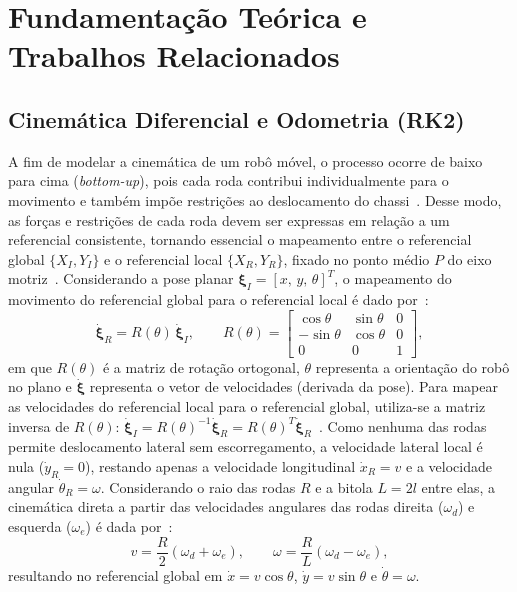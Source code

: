 \section{Fundamentação Teórica e Trabalhos Relacionados}

\subsection{Cinemática Diferencial e Odometria (RK2)}

A fim de modelar a cinemática de um robô móvel, o processo ocorre de
baixo para cima (\textit{bottom-up}), pois cada roda contribui         
individualmente para o movimento e também impõe restrições ao    
deslocamento do chassi~\cite{siegwart2004}. Desse modo, as forças e      
restrições de cada roda devem ser expressas em relação a um referencial  
consistente, tornando essencial o mapeamento entre o referencial global  
$\{X_I, Y_I\}$ e o referencial local $\{X_R, Y_R\}$, fixado no ponto     
médio $P$ do eixo motriz~\cite{siegwart2004}. Considerando a pose planar
$\boldsymbol{\xi}_I = [x,\, y,\, \theta]^T$, o mapeamento do movimento do
referencial global para o referencial local é dado
por~\cite{siegwart2004}:
\begin{equation}
\dot{\boldsymbol{\xi}}_R = R(\theta)\,\dot{\boldsymbol{\xi}}_I, 
\qquad
R(\theta) =
\begin{bmatrix}
\cos\theta & \sin\theta & 0 \\
-\sin\theta & \cos\theta & 0 \\ 
0 & 0 & 1 
\end{bmatrix}, 
\label{eq:rotacao_global_local}
\end{equation} 
em que $R(\theta)$ é a matriz de rotação ortogonal, $\theta$ representa a
orientação do robô no plano e $\dot{\boldsymbol{\xi}}$ representa o vetor
de velocidades (derivada da pose). Para mapear as velocidades do 
referencial local para o referencial global, utiliza-se a matriz inversa 
de $R(\theta)$: $\dot{\boldsymbol{\xi}}_I =
R(\theta)^{-1}\dot{\boldsymbol{\xi}}_R =
R(\theta)^T\dot{\boldsymbol{\xi}}_R$~\cite{siegwart2004}. Como nenhuma 
das rodas permite deslocamento lateral sem escorregamento, a velocidade 
lateral local é nula ($\dot{y}_R = 0$), restando apenas a velocidade 
longitudinal $\dot{x}_R = v$ e a velocidade angular $\dot{\theta}_R =
\omega$. Considerando o raio das rodas $R$ e a bitola $L = 2l$ entre     
elas, a cinemática direta a partir das velocidades angulares das rodas
direita ($\omega_d$) e esquerda ($\omega_e$) é dada 
por~\cite{siegwart2004}: 
\begin{equation}
v = \frac{R}{2}(\omega_d + \omega_e), \qquad 
\omega = \frac{R}{L}(\omega_d - \omega_e),
\label{eq:cinematica_direta} 
\end{equation}
resultando no referencial global em $\dot{x} = v\cos\theta$, $\dot{y} =
v\sin\theta$ e $\dot{\theta} = \omega$.

